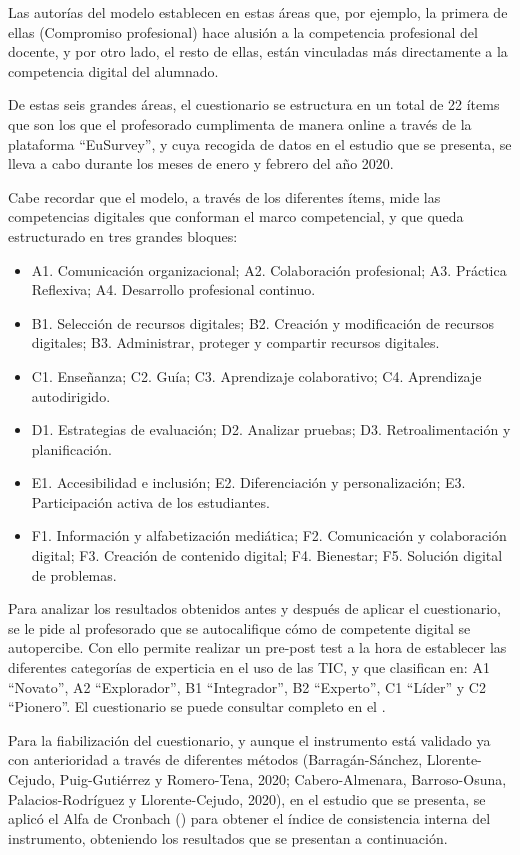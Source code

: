 \documentclass[spanish]{textolivre}
\begin{document}
Las autorías del modelo establecen en estas áreas que, por ejemplo, la primera de ellas (Compromiso profesional) hace alusión a la competencia profesional del docente, y por otro lado, el resto de ellas, están vinculadas más directamente a la competencia digital del alumnado. 

De estas seis grandes áreas, el cuestionario se estructura en un total de 22 ítems que son los que el profesorado cumplimenta de manera online a través de la plataforma “EuSurvey”, y cuya recogida de datos en el estudio que se presenta, se lleva a cabo durante los meses de enero y febrero del año 2020. 

Cabe recordar que el modelo, a través de los diferentes ítems, mide las competencias digitales que conforman el marco competencial, y que queda estructurado en tres grandes bloques: 

\begin{itemize}
    \item A1. Comunicación organizacional; A2. Colaboración profesional; A3. Práctica Reflexiva; A4. Desarrollo profesional continuo. 
    \item B1. Selección de recursos digitales; B2. Creación y modificación de recursos digitales; B3. Administrar, proteger y compartir recursos digitales. 
    \item C1. Enseñanza; C2. Guía; C3. Aprendizaje colaborativo; C4. Aprendizaje autodirigido.
    \item D1. Estrategias de evaluación; D2. Analizar pruebas; D3. Retroalimentación y planificación.
    \item E1. Accesibilidad e inclusión; E2. Diferenciación y personalización; E3. Participación activa de los estudiantes. 
    \item F1. Información y alfabetización mediática; F2. Comunicación y colaboración digital; F3. Creación de contenido digital; F4. Bienestar; F5. Solución digital de problemas.
\end{itemize}

Para analizar los resultados obtenidos antes y después de aplicar el cuestionario, se le pide al profesorado que se autocalifique cómo de competente digital se autopercibe. Con ello permite realizar un pre-post test a la hora de establecer las diferentes categorías de experticia en el uso de las TIC, y que clasifican en: A1 “Novato”, A2 “Explorador”, B1 “Integrador”, B2 “Experto”, C1 “Líder” y C2 “Pionero”. El cuestionario se puede consultar completo en el .

Para la fiabilización del cuestionario, y aunque el instrumento está validado ya con anterioridad a través de diferentes métodos (Barragán-Sánchez, Llorente-Cejudo, Puig-Gutiérrez y Romero-Tena, 2020; Cabero-Almenara, Barroso-Osuna, Palacios-Rodríguez y Llorente-Cejudo, 2020), en el estudio que se presenta, se aplicó el Alfa de Cronbach () para obtener el índice de consistencia interna del instrumento, obteniendo los resultados que se presentan a continuación. 
\end{document}
